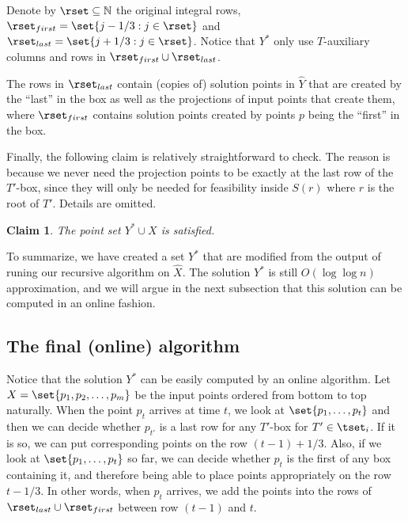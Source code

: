 \documentclass[11pt]{article}
\numberwithin{equation}{section}
\newtheorem{claim}[theorem]{Claim}
\theoremstyle{definition}
\theoremstyle{plain}
\begin{document}
Denote by $\rset \subseteq {\mathbb N}$ the original integral rows, $\rset_{first}=\set{j - 1/3: j \in \rset}$ and $\rset_{last} = \set{j + 1/3: j \in \rset}$.
Notice that $Y^*$ only use $T$-auxiliary columns and rows in $\rset_{first} \cup \rset_{last}$.

\begin{observation}
The rows in $\rset_{last}$ contain (copies of) solution points in $\hat{Y}$ that are created by the ``last'' in the box as well as the projections of input points that create them, where $\rset_{first}$ contains solution points created by points $p$ being the ``first'' in the box.  
\end{observation}  

Finally, the following claim is relatively straightforward to check. The reason is because we never need the projection points to be exactly at the last row of the $T'$-box, since they will only be needed for feasibility inside $S(r)$ where $r$ is the root of $T'$. 
Details are omitted. 

\begin{claim}
The point set $Y^* \cup X$ is satisfied. 
\end{claim}  

To summarize, we have created a set $Y^*$ that are modified from the output of runing our recursive algorithm on $\hat{X}$. 
The solution $Y^*$ is still $O(\log \log n)$ approximation, and we will argue in the next subsection that this solution can be computed in an online fashion.  
   

\subsection{The final (online) algorithm}  
\label{subsec: online alg}

Notice that the solution $Y^*$ can be easily computed by an online algorithm. Let $X= \set{p_1,p_2,\ldots, p_m}$ be the input points ordered from bottom to top naturally.  
When the point $p_t$ arrives at time $t$, we look at $\set{p_1,\ldots, p_t}$ and then we can decide whether $p_{t'}$ is a last row for any $T'$-box for $T' \in \tset_i$. 
If it is so, we can put corresponding points on the row $(t-1) + 1/3$. 
Also, if we look at $\set{p_1,\ldots, p_t}$ so far, we can decide whether $p_t$ is the first of any box containing it, and therefore being able to place points appropriately on the row $t - 1/3$.  
In other words, when $p_t$ arrives, we add the points into the rows of $\rset_{last} \cup \rset_{first}$ between row $(t-1)$ and $t$.    
 
\end{document}
